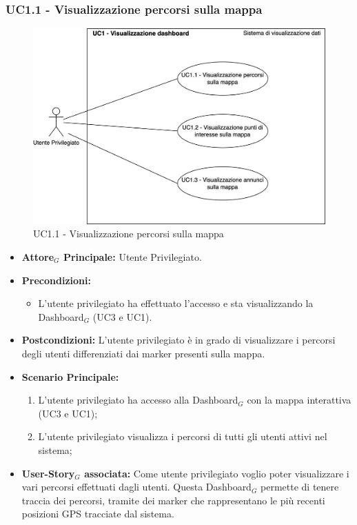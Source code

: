\documentclass[11pt]{article}
\begin{document}
\begin{justify}

\subsubsection{\textbf{UC1.1 - Visualizzazione percorsi sulla mappa}}
\begin{figure}[H]
    \centering
    \includegraphics[width=0.7\linewidth]{UC1.123image.png}
    \caption{UC1.1 - Visualizzazione percorsi sulla mappa}
    \label{fig:UC1.1}
\end{figure}
\label{UC1.1}
\begin{itemize}
     \item \textbf{Attore$_G$ Principale:} Utente Privilegiato.
     \item \textbf{Precondizioni:}
        \begin{itemize}
    		\item L'utente privilegiato ha effettuato l'accesso e sta      visualizzando la Dashboard$_G$ (UC3 e UC1).
        \end{itemize}
     \item \textbf{Postcondizioni:} L'utente privilegiato è in grado di visualizzare i percorsi degli utenti differenziati dai marker presenti sulla mappa.
     \item \textbf{Scenario Principale:}
        \begin{enumerate}
            \item L'utente privilegiato ha accesso alla Dashboard$_G$ con la mappa interattiva (UC3 e UC1);
            \item L'utente privilegiato visualizza i percorsi di tutti gli utenti attivi nel sistema;
        \end{enumerate}
     \item \textbf{User-Story$_G$ associata:}
     Come utente privilegiato voglio poter visualizzare i vari percorsi effettuati dagli utenti. Questa Dashboard$_G$ permette di tenere traccia dei percorsi, tramite dei marker che rappresentano le più recenti posizioni GPS tracciate dal sistema.
\end{itemize}

\end{justify}
\end{document}
